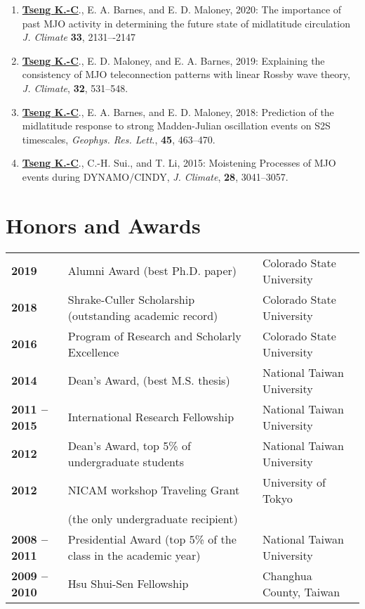 \documentclass{article}
\begin{document}
\begin{enumerate}
	\item \normalsize{\bf{\underline{Tseng K.-C}}}., E. A. Barnes, and E. D. Maloney, 2020: The importance of past MJO activity in determining the future state of midlatitude circulation  \textit{J. Climate} \normalsize{\bf{33}}, 2131–-2147
	\item \normalsize{\bf{\underline{Tseng K.-C}}}., E. D. Maloney, and E. A. Barnes, 2019: Explaining the consistency of MJO teleconnection patterns with linear Rossby wave theory, \textit{J. Climate}, \normalsize{\bf{32}}, 531--548.
	\item \normalsize{\bf{\underline{Tseng K.-C}}}., E. A. Barnes, and E. D. Maloney, 2018: Prediction of the midlatitude response to strong Madden-Julian oscillation events on S2S timescales, \textit{Geophys. Res. Lett}., \normalsize{\bf{45}}, 463--470. \par
	\item \normalsize{\bf{\underline{Tseng K.-C}}}., C.-H. Sui., and T. Li, 2015: Moistening Processes of MJO events during DYNAMO/CINDY, \textit{J. Climate}, \normalsize{\bf{28}}, 3041--3057.
    \end{enumerate}


\section{\color{airforceblue}Honors and Awards}
\begin{tabular}{>{\bfseries}p{2.5cm}p{10cm}p{\linewidth-2.5cm\relax}}
     2019   & Alumni Award (best Ph.D. paper) & Colorado State University 
     \\
     2018   & Shrake-Culler Scholarship (outstanding academic record) & Colorado State University 
     \\  
	 2016   & Program of Research and Scholarly Excellence & Colorado State University 
	 \\
     2014  & Dean’s Award, (best M.S. thesis) & National Taiwan University 
     \\
     2011 -- 2015 & International Research Fellowship & National Taiwan University 
     \\
     2012        & Dean’s Award, top 5\% of undergraduate students & National Taiwan University  
     \\
     2012        & NICAM workshop Traveling Grant  & University of Tokyo
     \\
                  & (the only undergraduate recipient)                                            &  \\  
     2008 -- 2011 & Presidential Award (top 5\% of the class in the academic year) & National Taiwan University 
     \\

     2009 -- 2010 & Hsu Shui-Sen Fellowship   & Changhua County, Taiwan 
     
\end{tabular}
\end{document}
